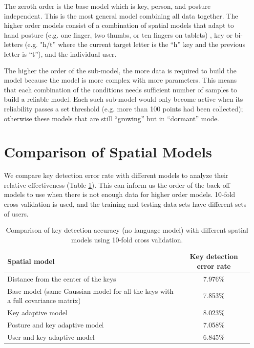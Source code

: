 \documentclass{sigchi}
\newcommand\tabhead[1]{\small\textbf{#1}}
\begin{document}
The zeroth order is the base model which is key, person, and posture
independent. This is the most general model combining all data together. The
higher order models consist of a combination of spatial models that adapt to hand 
posture (e.g. one finger, two thumbs, or ten fingers on tablets) , key or 
bi-letters (e.g. "h/t” where the current target letter is the “h” key and the 
previous letter is “t”), and the individual user. 

The higher the order of the sub-model, the more data is required to build the model because
the model is more complex with more parameters. This means that each combination of the 
conditions needs sufficient number of samples to build a reliable model. Each 
such sub-model would only become active when its reliability passes a set 
threshold (e.g. more than 100 points had been collected); otherwise these models
 that are still “growing” but in “dormant” mode.

\section{Comparison of Spatial Models}
We compare key detection error rate with different models to analyze their
relative effectiveness (Table \ref{tab:comparison}). This can inform us the order of the
back-off models to use when there is not enough data for higher order models.
10-fold cross validation is used, and the training and testing data sets have
different sets of users.

\begin{table} [tb]
  \centering
  \begin{tabular}{|l|c|}
    \hline
    \tabhead{Spatial model} &
    \multicolumn{1}{|p{0.2\columnwidth}|}{\centering\tabhead{Key detection
    error rate}} \\
    \hline
    Distance from the center of the keys & 7.976\% \\
    \hline
    \multicolumn{1}{|p{0.7\columnwidth}|}{Base model (same Gaussian model for
    all the keys with a full covariance matrix)} & 7.853\% \\
    \hline
    Key adaptive model  & 8.023\% \\
    \hline
    Posture and key adaptive model & 7.058\% \\
    \hline
    User and key adaptive model  & 6.845\% \\
    \hline
  \end{tabular}
  \caption{Comparison of key detection accuracy (no language model) with
  different spatial models using 10-fold cross validation.}
  \label{tab:comparison}
\end{table}
\end{document}
